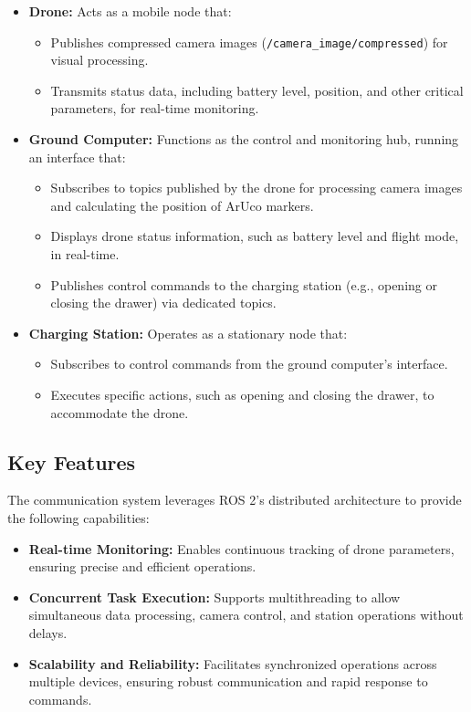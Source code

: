     \begin{itemize} 
        \item \textbf{Drone:} Acts as a mobile node that: 
        \begin{itemize} 
            \item Publishes compressed camera images (\texttt{/camera\_image/compressed}) for visual processing.
            \item Transmits status data, including battery level, position, and other critical parameters, for real-time monitoring.
        \end{itemize}

        \item \textbf{Ground Computer:} Functions as the control and monitoring hub, running an interface that: 
        \begin{itemize} 
            \item Subscribes to topics published by the drone for processing camera images and calculating the position of ArUco markers. 
            \item Displays drone status information, such as battery level and flight mode, in real-time. 
            \item Publishes control commands to the charging station (e.g., opening or closing the drawer) via dedicated topics. 
        \end{itemize} 
        \item \textbf{Charging Station:} Operates as a stationary node that: 
        \begin{itemize} 
            \item Subscribes to control commands from the ground computer's interface. 
            \item Executes specific actions, such as opening and closing the drawer, to accommodate the drone. 
        \end{itemize} 
    \end{itemize}
    
    \subsection{Key Features} The communication system leverages ROS 2's distributed architecture to provide the following capabilities: 
    \begin{itemize} 
        \item \textbf{Real-time Monitoring:} Enables continuous tracking of drone parameters, ensuring precise and efficient operations. 
        \item \textbf{Concurrent Task Execution:} Supports multithreading to allow simultaneous data processing, camera control, and station operations without delays. 
        \item \textbf{Scalability and Reliability:} Facilitates synchronized operations across multiple devices, ensuring robust communication and rapid response to commands. 
    \end{itemize}
    
